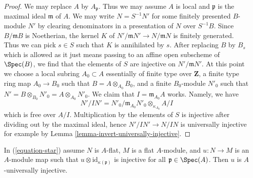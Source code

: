 \begin{proof}
We may replace $A$ by $A_\mathfrak p$. Thus we may assume $A$ is
local and $\mathfrak p$ is the maximal ideal $\mathfrak m$ of $A$.
We may write $N = S^{-1}N'$ for some finitely presented $B$-module $N'$
by clearing denominators in a presentation of $N$ over $S^{-1}B$.
Since $B/\mathfrak m B$ is Noetherian, the kernel $K$ of
$N'/\mathfrak m N' \to N/\mathfrak m N$ is finitely generated.
Thus we can pick $s \in S$ such that $K$ is annihilated by $s$.
After replacing $B$ by $B_s$ which is allowed as it just means passing
to an affine open subscheme of $\Spec(B)$, we find that the elements of $S$
are injective on $N'/\mathfrak m N'$. At this point we choose
a local subring $A_0 \subset A$ essentially of finite type over $\mathbf{Z}$,
a finite type ring map $A_0 \to B_0$ such that $B = A \otimes_{A_0} B_0$,
and a finite $B_0$-module $N'_0$ such that
$N' = B \otimes_{B_0} N'_0 = A \otimes_{A_0} N'_0$.
We claim that $I = \mathfrak m_{A_0} A$ works.
Namely, we have
$$
N'/IN' = N'_0/\mathfrak m_{A_0} N'_0 \otimes_{\kappa_{A_0}} A/I
$$
which is free over $A/I$. Multiplication by the elements of $S$
is injective after dividing out by the maximal ideal, hence
$N'/IN' \to N/IN$ is universally injective for example by
Lemma \ref{lemma-invert-universally-injective}.
\end{proof}

\begin{lemma}
\label{lemma-universally-injective-if-flat}
In (\ref{equation-star}) assume $N$ is $A$-flat, $M$ is a flat $A$-module,
and $u : N \to M$ is an $A$-module map such that
$u \otimes \text{id}_{\kappa(\mathfrak p)}$ is injective for all
$\mathfrak p \in \Spec(A)$. Then $u$ is $A$-universally injective.
\end{lemma}

